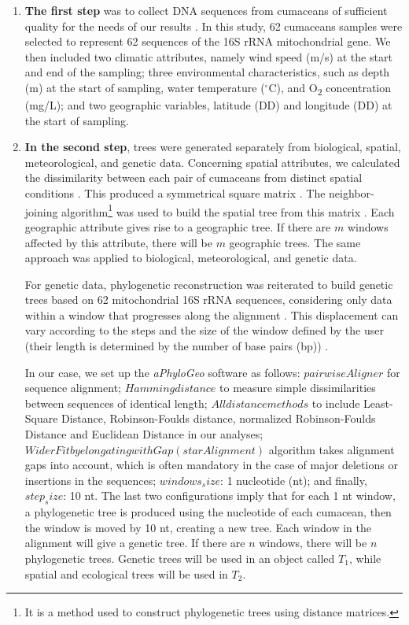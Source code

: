 \begin{enumerate}
\item \textbf{The first step} was to collect DNA sequences from cumaceans of sufficient quality for the needs of our results \citep{koshkarov_phylogeography_2022}. In this study, 62 cumaceans samples were selected to represent 62 sequences of the 16S rRNA mitochondrial gene. We then included two climatic attributes, namely wind speed (m/s) at the start and end of the sampling; three environmental characteristics, such as depth (m) at the start of sampling, water temperature ($^\circ$C), and O\textsubscript{2} concentration (mg/L); and two geographic variables, latitude (DD) and longitude (DD) at the start of sampling.

\item \textbf{In the second step}, trees were generated separately from biological, spatial, meteorological, and genetic data. Concerning spatial attributes, we calculated the dissimilarity between each pair of cumaceans from distinct spatial conditions \citep{koshkarov_phylogeography_2022}. This produced a symmetrical square matrix \citep{koshkarov_phylogeography_2022}. The {neighbor-joining algorithm}\footnote{It is a method used to construct phylogenetic trees using distance matrices.} was used to build the spatial tree from this matrix \citep{koshkarov_phylogeography_2022}. Each geographic attribute gives rise to a geographic tree. If there are $m$ windows affected by this attribute, there will be $m$ geographic trees. The same approach was applied to biological, meteorological, and genetic data. 

For genetic data, phylogenetic reconstruction was reiterated to build genetic trees based on 62 mitochondrial 16S rRNA sequences, considering only data within a window that progresses along the alignment \citep{koshkarov_phylogeography_2022}. This displacement can vary according to the steps and the size of the window defined by the user (their length is determined by the number of base pairs (bp)) \citep{koshkarov_phylogeography_2022}. 

In our case, we set up the \textit{aPhyloGeo} software as follows: $pairwiseAligner$ for sequence alignment; $Hamming distance$ to measure simple dissimilarities between sequences of identical length; $All distance methods$ to include Least-Square Distance, Robinson-Foulds distance, normalized Robinson-Foulds Distance and Euclidean Distance in our analyses; $Wider Fit by elongating with Gap (starAlignment)$ algorithm takes alignment gaps into account, which is often mandatory in the case of major deletions or insertions in the sequences; $windows_size$: 1 nucleotide (nt); and finally, $step_size$: 10 nt. The last two configurations imply that for each 1 nt window, a phylogenetic tree is produced using the nucleotide of each cumacean, then the window is moved by 10 nt, creating a new tree. Each window in the alignment will give a genetic tree. If there are $n$ windows, there will be $n$ phylogenetic trees. Genetic trees will be used in an object called $T_1$, while spatial and ecological trees will be used in $T_2$.


\end{enumerate}
